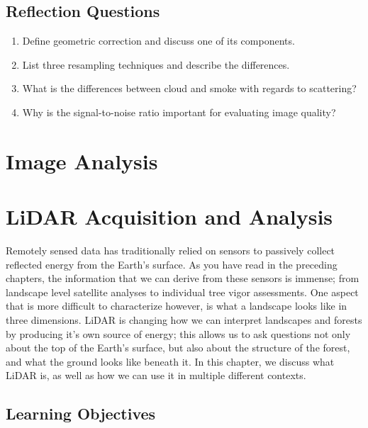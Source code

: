 \documentclass[
]{book}
\providecommand{\tightlist}{%
  \setlength{\itemsep}{0pt}\setlength{\parskip}{0pt}}
\begin{document}
\hypertarget{reflection-questions-10}{%
\section*{Reflection Questions}\label{reflection-questions-10}}

\begin{enumerate}
\def\labelenumi{\arabic{enumi}.}
\tightlist
\item
  Define geometric correction and discuss one of its components.
\item
  List three resampling techniques and describe the differences.
\item
  What is the differences between cloud and smoke with regards to
  scattering?
\item
  Why is the signal-to-noise ratio important for evaluating image
  quality?
\end{enumerate}

\hypertarget{image-analysis}{%
\chapter{Image Analysis}\label{image-analysis}}

\hypertarget{LiDAR-acquisition-and-analysis}{%
\chapter{LiDAR Acquisition and Analysis}\label{LiDAR-acquisition-and-analysis}}

Remotely sensed data has traditionally relied on sensors to passively collect reflected energy from the Earth's surface. As you have read in the preceding chapters, the information that we can derive from these sensors is immense; from landscape level satellite analyses to individual tree vigor assessments. One aspect that is more difficult to characterize however, is what a landscape looks like in three dimensions. LiDAR is changing how we can interpret landscapes and forests by producing it's own source of energy; this allows us to ask questions not only about the top of the Earth's surface, but also about the structure of the forest, and what the ground looks like beneath it. In this chapter, we discuss what LiDAR is, as well as how we can use it in multiple different contexts.

\hypertarget{learning-objectives-13}{%
\section*{Learning Objectives}\label{learning-objectives-13}}
\end{document}
